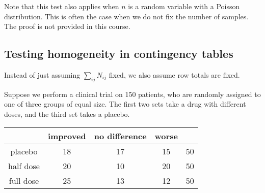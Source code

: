 \begin{remark}
	Note that this test also applies when $n$ is a random variable with a Poisson distribution.
	This is often the case when we do not fix the number of samples.
	The proof is not provided in this course.
\end{remark} 

\subsection{Testing homogeneity in contingency tables}
Instead of just assuming $\sum_{ij} N_{ij}$ fixed, we also assume row totals are fixed.

\begin{example}
	Suppose we perform a clinical trial on 150 patients, who are randomly assigned to one of three groups of equal size.
	The first two sets take a drug with different doses, and the third set takes a placebo.

	\begin{center}
		\begin{tabular}{c | c c c | c}
			          & improved & no difference & worse &    \\\hline
			placebo   & 18       & 17            & 15    & 50 \\
			half dose & 20       & 10            & 20    & 50 \\
			full dose & 25       & 13            & 12    & 50
		\end{tabular}
	\end{center}


\end{example}
